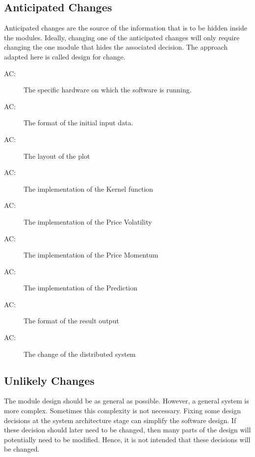 \documentclass[12pt, titlepage]{article}
\newcounter{acnum}
\newcommand{\actheacnum}{AC\theacnum}
\begin{document}
\subsection{Anticipated Changes} \label{SecAchange}

Anticipated changes are the source of the information that is to be hidden
inside the modules. Ideally, changing one of the anticipated changes will only
require changing the one module that hides the associated decision. The approach
adapted here is called design for
change.

\begin{description}
\item[ \actheacnum \label{AC1}:] The specific
hardware on which the software is running.
\item[ \actheacnum \label{AC2}:] The format of the
initial input data.
\item[ \actheacnum \label{AC3}:] The layout of the plot
\item[ \actheacnum \label{AC4}:] The implementation of the Kernel function
\item[ \actheacnum \label{AC5}:] The implementation of the Price Volatility
\item[ \actheacnum \label{AC6}:] The implementation of the Price Momentum
\item[ \actheacnum \label{AC7}:] The implementation of the Prediction
\item[ \actheacnum \label{AC8}:] The format of the result output 
\item[ \actheacnum \label{AC9}:] The change of the distributed system
\end{description}

\subsection{Unlikely Changes} \label{SecUchange}

The module design should be as general as possible. However, a general system is
more complex. Sometimes this complexity is not necessary. Fixing some design
decisions at the system architecture stage can simplify the software design. If
these decision should later need to be changed, then many parts of the design
will potentially need to be modified. Hence, it is not intended that these
decisions will be changed.
\end{document}
